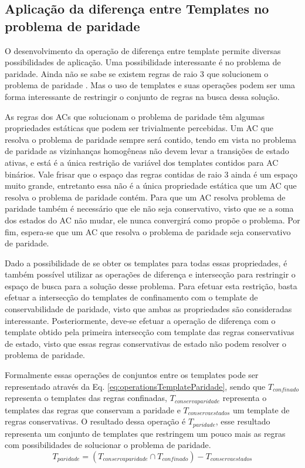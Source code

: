 \subsection{Aplicação da diferença entre Templates no problema de paridade}
O desenvolvimento da operação de diferença entre template permite diversas possibilidades de aplicação.
Uma possibilidade interessante é no problema de paridade. 
Ainda não se sabe se existem regras de raio 3 que solucionem o problema de paridade \cite{Betel2013}. 
Mas o uso de templates e suas operações podem ser uma forma interessante de restringir o conjunto de regras na busca dessa solução.

As regras dos ACs que solucionam o problema de paridade têm algumas propriedades estáticas que podem ser trivialmente percebidas. 
Um AC que resolva o problema de paridade sempre será contido, tendo em vista no problema de paridade as vizinhanças homogêneas não devem levar a transições de estado ativas, e está é a única restrição de variável dos templates contidos para AC binários. 
Vale frisar que o espaço das regras contidas de raio 3 ainda é um espaço muito grande, entretanto essa não é a única propriedade estática que um AC que resolva o problema de paridade contém. 
Para que um AC resolva problema de paridade também é necessário que ele não seja conservativo, visto que se a soma dos estados do AC não mudar, ele nunca convergirá como propõe o problema. 
Por fim, espera-se que um AC que resolva o problema de paridade seja conservativo de paridade.

Dado a possibilidade de se obter os templates para todas essas propriedades, é também possível utilizar as operações de diferença e intersecção para restringir o espaço de busca para a solução desse problema.
Para efetuar esta restrição, basta efetuar a intersecção do templates de confinamento com o template de conservabilidade de paridade, visto que ambas as propriedades são consideradas interessante. 
Posteriormente, deve-se efetuar a operação de diferença com o template obtido pela primeira intersecção com template das regras conservativas de estado, visto que essas regras conservativas de estado não podem resolver o problema de paridade.

Formalmente essas operações de conjuntos entre os templates pode ser representado através da Eq. \eqref{eq:operationsTemplateParidade}, sendo que $T_{confinado}$ representa o templates das regras confinadas, $T_{conservaparidade}$ representa o templates das regras que conservam a paridade e ${T}_{conservaestados}$ um template de regras conservativas. O resultado dessa operação é $T_{paridade}$, esse resultado representa um conjunto de templates que restringem um pouco mais as regras com possibilidades de solucionar o problema de paridade.
\begin{equation}
T_{paridade} = (T_{conservaparidade} \cap T_{confinado}) - {T}_{conservaestados}
\label{eq:operationsTemplateParidade}
\end{equation}